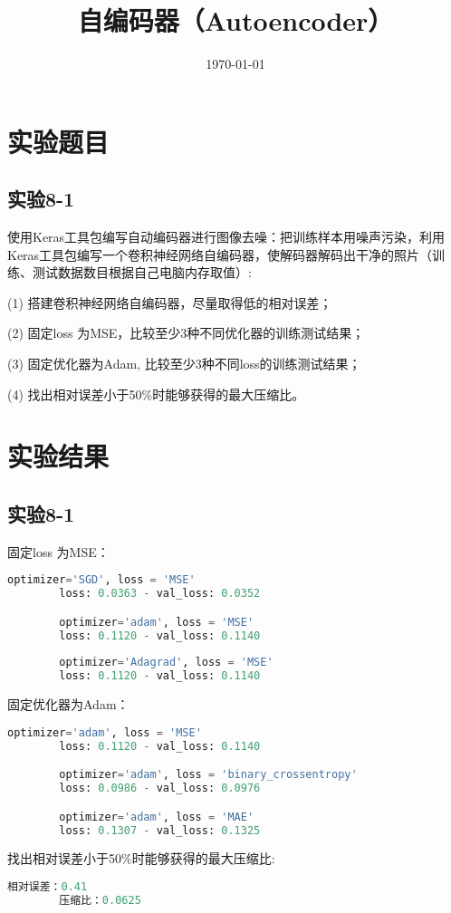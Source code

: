 \documentclass{../source/Experiment}
\title{自编码器（Autoencoder）}
\date{\today}
\begin{document}
\makecover
\section{实验题目}
\subsection{实验8-1}
使用Keras工具包编写自动编码器进行图像去噪：把训练样本用噪声污染，利用Keras工具包编写一个卷积神经网络自编码器，使解码器解码出干净的照片（训练、测试数据数目根据自己电脑内存取值）:

(1)  搭建卷积神经网络自编码器，尽量取得低的相对误差；

(2)  固定loss 为MSE，比较至少3种不同优化器的训练测试结果；

(3)  固定优化器为Adam, 比较至少3种不同loss的训练测试结果；

(4)  找出相对误差小于50\%时能够获得的最大压缩比。

\section{实验结果}
\subsection{实验8-1}

固定loss 为MSE：

\begin{lstlisting}[language = python]
        optimizer='SGD', loss = 'MSE'
        loss: 0.0363 - val_loss: 0.0352

        optimizer='adam', loss = 'MSE'
        loss: 0.1120 - val_loss: 0.1140
            
        optimizer='Adagrad', loss = 'MSE'
        loss: 0.1120 - val_loss: 0.1140
        \end{lstlisting}

固定优化器为Adam：

\begin{lstlisting}[language = python]
        optimizer='adam', loss = 'MSE'
        loss: 0.1120 - val_loss: 0.1140

        optimizer='adam', loss = 'binary_crossentropy'
        loss: 0.0986 - val_loss: 0.0976

        optimizer='adam', loss = 'MAE'
        loss: 0.1307 - val_loss: 0.1325
        \end{lstlisting}

找出相对误差小于50\%时能够获得的最大压缩比:
\begin{lstlisting}[language = python]
        相对误差：0.41
        压缩比：0.0625
        \end{lstlisting}
\end{document}
